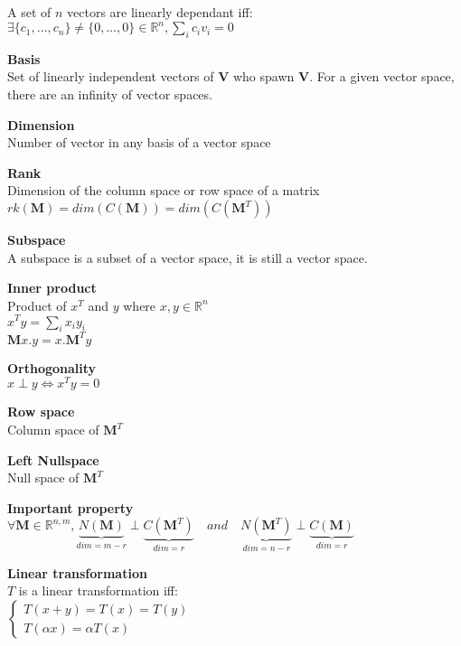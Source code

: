 \documentclass[10pt,letterpaper,landscape]{report}
\newcommand{\boxheight}{21.59cm}
\newcommand{\boxwidth}{8.85cm}
\begin{document}
\begin{small}
{\begin{minipage}[t][\boxheight][c]{\boxwidth}
    A set of $n$ vectors are linearly dependant iff: \\
    $\exists \{c_1, \dots, c_n\} \neq \{0, \dots, 0\} \in \mathbb{R}^n, \sum_i c_i v_i = 0 $

    \textbf{Basis}\\
    Set of linearly independent vectors of $\mathbf{V}$ who spawn $\mathbf{V}$. For a given vector space, there are an infinity of vector spaces.
    
    \textbf{Dimension} \\
    Number of vector in any basis of a vector space
    
    \textbf{Rank} \\
    Dimension of the column space or row space of a matrix \\
    $rk(\mathbf{M}) = dim(C(\mathbf{M})) = dim(C(\mathbf{M}^T))$
    
    \textbf{Subspace} \\
    A subspace is a subset of a vector space, it is still a vector space.
    
    \textbf{Inner product} \\
    Product of $x^T$ and $y$ where $x,y \in \mathbb{R}^n$ \\
    $x^T y = \sum_i x_i y_i$\\
    $\mathbf{M}x.y = x.\mathbf{M}^Ty$
    
    \textbf{Orthogonality} \\
    $x \perp y \iff x^T y = 0$
    
    \textbf{Row space} \\
    Column space of $\mathbf{M}^T$
    
    \textbf{Left Nullspace} \\
    Null space of $\mathbf{M}^T$
    
    \textbf{Important property} \\ 
    $\forall \mathbf{M} \in \mathbb{R}^{n, m}, \underbrace{N(\mathbf{M})}_{dim = m - r} \perp \underbrace{C(\mathbf{M}^T)}_{dim = r} \quad and \quad \underbrace{N(\mathbf{M}^T)}_{dim = n - r} \perp \underbrace{C(\mathbf{M})}_{dim = r}$
    
    \textbf{Linear transformation} \\
    $T$ is a linear transformation iff: \\
    $\left\{ 
    \begin{array}{l}
    T(x + y)  = T(x) = T(y) \\
    T(\alpha x) = \alpha T(x)
    \end{array}
    \right.$
    

\end{minipage}}
\end{small}
\end{document}
